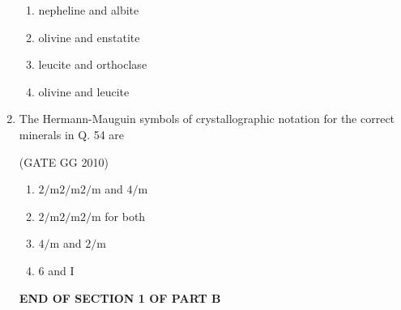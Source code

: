 \documentclass[journal]{IEEEtran}
\begin{document}
\begin{enumerate}[start=1]
\begin{enumerate}
    \item nepheline and albite

\item  olivine and enstatite

\item leucite and orthoclase

\item olivine and leucite

\end{enumerate}
    
\item The Hermann-Mauguin symbols of crystallographic notation for the correct minerals in Q. 54 are

\hfill{(GATE GG 2010)}

\begin{enumerate}
    \item $2/ \text{m}2/ \text{m}2/ \text{m}$ and $4/ \text{m}$
    \item $2/ \text{m}2/ \text{m}2/ \text{m}$ for both
    \item $4/ \text{m}$ and  $2/ \text{m}$
    \item $6$ and I
    
\end{enumerate}
\vspace{1cm}
\hspace{3cm} \textbf{END OF SECTION 1 OF PART B}
\end{enumerate}
\end{document}
